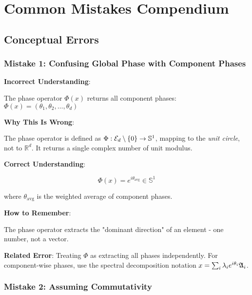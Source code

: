 
\chapter{Common Mistakes Compendium}

\section{Conceptual Errors}

\subsection{Mistake 1: Confusing Global Phase with Component Phases}

\begin{warning}
\textbf{Incorrect Understanding}:

The phase operator $\Phi(x)$ returns all component phases: $\Phi(x) = (\theta_1, \theta_2, \ldots, \theta_d)$

\textbf{Why This Is Wrong}:

The phase operator is defined as $\Phi: \mathcal{E}_{d} \setminus \{0\} \rightarrow \mathbb{S}^1$, mapping to the \textit{unit circle}, not to $\mathbb{R}^d$. It returns a single complex number of unit modulus.

\textbf{Correct Understanding}:

$$\Phi(x) = e^{i\theta_{\text{avg}}} \in \mathbb{S}^1$$

where $\theta_{\text{avg}}$ is the weighted average of component phases.

\textbf{How to Remember}:

The phase operator extracts the "dominant direction" of an element - one number, not a vector.

\textbf{Related Error}: Treating $\Phi$ as extracting all phases independently. For component-wise phases, use the spectral decomposition notation $x = \sum_i \lambda_i e^{i\theta_i} \mathfrak{A}_{i}$.
\end{warning}

\subsection{Mistake 2: Assuming Commutativity}

